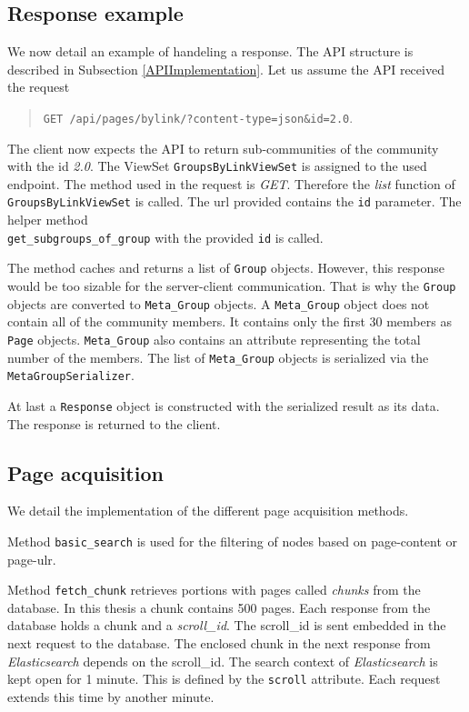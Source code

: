 \begin{appendices}
\subsection{Response example} \label{dixAPIResponse}
 We now detail an example of handeling a response. The API structure is described in Subsection \ref{APIImplementation}. Let us assume the API received the request 
\begin{quotation}
 \texttt{GET /api/pages/bylink/?content-type=json\&id=2.0}. 
\end{quotation}
The client now expects the API to return sub-communities of the community with the id \textit{2.0}. The ViewSet \texttt{GroupsByLinkViewSet} is assigned to the used endpoint. The method used in the request is \textit{GET}. Therefore the \textit{list} function of \texttt{GroupsByLinkViewSet} is called. The url provided contains the \texttt{id} parameter. The helper method \\ \texttt{get\_subgroups\_of\_group} with the provided \texttt{id} is called. 

The method caches and returns a list of \texttt{Group} objects. However, this response would be too sizable for the server-client communication. That is why the \texttt{Group} objects are converted to \texttt{Meta\_Group} objects. A \texttt{Meta\_Group} object does not contain all of the community members. It contains only the first 30 members as \texttt{Page} objects. \texttt{Meta\_Group} also contains an attribute representing the total number of the members. The list of \texttt{Meta\_Group} objects is serialized via the \texttt{MetaGroupSerializer}. 

At last a \texttt{Response} object is constructed with the serialized result as its data. The response is returned to the client.

\subsection{Page acquisition} \label{dixRepositories}
We detail the implementation of the different page acquisition methods.

Method \texttt{basic\_search} is used for the filtering of nodes based on page-content or page-ulr. 

Method \texttt{fetch\_chunk} retrieves portions with pages called \textit{chunks} from the database. In this thesis a chunk contains 500 pages. Each response from the database holds a chunk and a \textit{scroll\_id}. The scroll\_id is sent embedded in the next request to the database. The enclosed chunk in the next response from \textit{Elasticsearch}  depends on the scroll\_id. The search context of \textit{Elasticsearch} is kept open for 1 minute. This is defined by the \texttt{scroll} attribute. Each request extends this time by another minute. 


\end{appendices}
